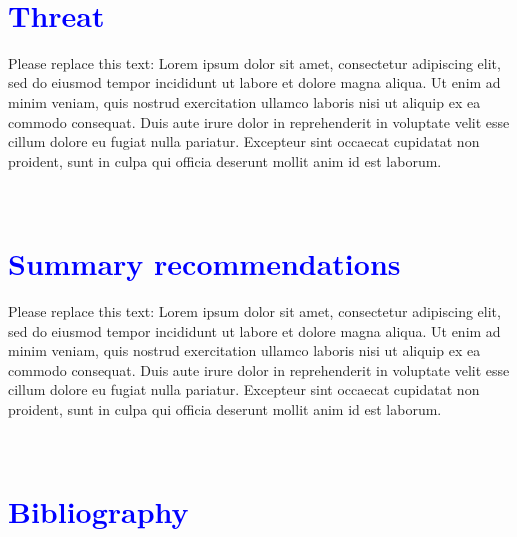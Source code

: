 \documentclass[a4paper, 11pt]{article}
\begin{document}
\ 
\section*{\textcolor{blue}{Threat}}

Please replace this text: Lorem ipsum dolor sit amet, consectetur adipiscing elit, sed do eiusmod tempor incididunt ut labore et dolore magna aliqua. Ut enim ad minim veniam, quis nostrud exercitation ullamco laboris nisi ut aliquip ex ea commodo consequat. Duis aute irure dolor in reprehenderit in voluptate velit esse cillum dolore eu fugiat nulla pariatur. Excepteur sint occaecat cupidatat non proident, sunt in culpa qui officia deserunt mollit anim id est laborum.



\ 
\section*{\textcolor{blue}{Summary recommendations}}

Please replace this text: Lorem ipsum dolor sit amet, consectetur adipiscing elit, sed do eiusmod tempor incididunt ut labore et dolore magna aliqua. Ut enim ad minim veniam, quis nostrud exercitation ullamco laboris nisi ut aliquip ex ea commodo consequat. Duis aute irure dolor in reprehenderit in voluptate velit esse cillum dolore eu fugiat nulla pariatur. Excepteur sint occaecat cupidatat non proident, sunt in culpa qui officia deserunt mollit anim id est laborum.


\ 

\vspace{1cm}
\section*{\textcolor{blue}{Bibliography} }
\printbibliography[heading=none]

\end{document}
